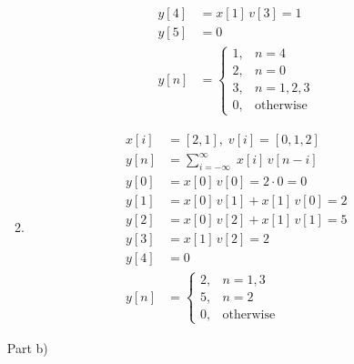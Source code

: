 \documentclass[12pt]{article}
\begin{document}
\begin{enumerate}
\begin{enumerate}
\begin{equation*}
\begin{aligned}
                y[4] &= x[1] \, v[3] = 1 \\
                y[5] &= 0 \\
                y[n] &= \begin{cases}
                    1, & n=4 \\
                    2, & n=0 \\
                    3, & n=1,2,3 \\
                    0, & \text{otherwise}
                \end{cases}
            \end{aligned}
        \end{equation*}
        \item
        \begin{equation*}
            \begin{aligned}
                x[i] &= [2,1],\; v[i] = [0,1,2] \\
                y[n] &= \sum_{i=-\infty}^{\infty} \; x[i] \, v[n-i] \\
                y[0] &= x[0] \, v[0] = 2\cdot0 = 0 \\
                y[1] &= x[0] \, v[1] + x[1] \, v[0] = 2 \\
                y[2] &= x[0] \, v[2] + x[1] \, v[1] = 5 \\
                y[3] &= x[1] \, v[2] = 2 \\
                y[4] &=  0 \\
                y[n] &= \begin{cases}
                    2, & n=1,3 \\
                    5, & n=2 \\
                    0, & \text{otherwise}
                \end{cases}
            \end{aligned}
        \end{equation*}
    \end{enumerate}
    Part b)


\end{enumerate}
\end{document}
